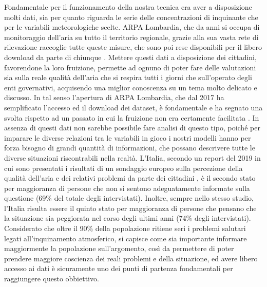 Fondamentale per il funzionamento della nostra tecnica era aver a disposizione molti dati, sia per quanto riguarda le serie delle concentrazioni di inquinante che per le variabili meteorologiche scelte. ARPA Lombardia, che da anni si occupa di monitoraggio dell'aria su tutto il territorio regionale, grazie alla sua vasta rete di rilevazione raccoglie tutte queste misure, che sono poi rese disponibili per il libero download
da parte di chiunque \cite{arpa_aria, arpa_meteo}. Mettere questi dati a disposizione dei cittadini, favorendone la loro fruizione, permette ad ognuno di poter fare delle valutazioni sia sulla reale qualità dell'aria che si respira tutti i giorni che sull'operato degli enti governativi, acquisendo una miglior conoscenza su un tema molto delicato e discusso. In tal senso l'apertura di ARPA Lombardia, che dal 2017 ha semplificato l'accesso ed il download dei dataset, è fondamentale e ha segnato una svolta rispetto ad un passato in cui la fruizione non era certamente facilitata \cite{trentini2014lombardy}. 
In assenza di questi dati non sarebbe possibile fare analisi di questo tipo, poiché per imparare le diverse relazioni tra le variabili in gioco i nostri modelli hanno per forza bisogno di grandi quantità di informazioni, che possano descrivere tutte le diverse situazioni riscontrabili nella realtà.  
L'Italia, secondo un report del 2019 in cui sono presentati i risultati di un sondaggio europeo sulla percezione della qualità dell'aria e dei relativi problemi da parte dei cittadini \cite{attitudes2019}, è il secondo stato per maggioranza di persone che non si sentono adeguatamente informate sulla questione (69\% del totale degli intervistati). Inoltre, sempre nello stesso studio, l'Italia risulta essere il quinto stato per maggioranza di persone che pensano che la situazione sia peggiorata nel corso degli ultimi anni (74\% degli intervistati). Considerato che oltre il 90\% della popolazione ritiene seri i problemi salutari legati all'inquinamento atmosferico, si capisce come sia importante informare maggiormente la popolazione sull'argomento, così da permettere di poter prendere maggiore coscienza dei reali problemi e della situazione, ed avere libero accesso ai dati è sicuramente uno dei punti di partenza fondamentali per raggiungere questo obbiettivo.

